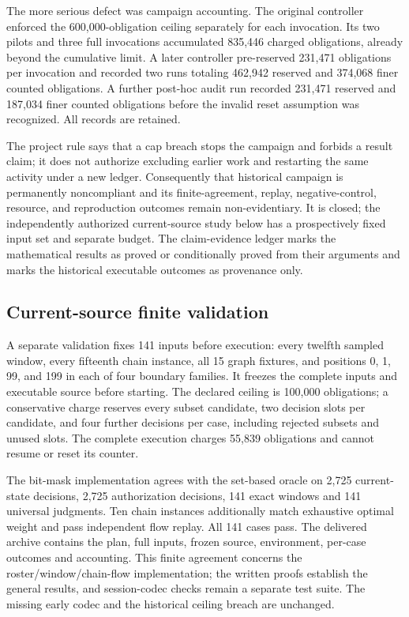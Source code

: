 \documentclass[11pt]{article}
\theoremstyle{definition}
\begin{document}
The more serious defect was campaign accounting.  The original controller enforced the 600,000-obligation ceiling separately for each invocation.  Its two pilots and three full invocations accumulated 835,446 charged obligations, already beyond the cumulative limit.  A later controller pre-reserved 231,471 obligations per invocation and recorded two runs totaling 462,942 reserved and 374,068 finer counted obligations.  A further post-hoc audit run recorded 231,471 reserved and 187,034 finer counted obligations before the invalid reset assumption was recognized.  All records are retained.

The project rule says that a cap breach stops the campaign and forbids a result claim; it does not authorize excluding earlier work and restarting the same activity under a new ledger.  Consequently that historical campaign is permanently noncompliant and its finite-agreement, replay, negative-control, resource, and reproduction outcomes remain non-evidentiary. It is closed; the independently authorized current-source study below has a prospectively fixed input set and separate budget.  The claim-evidence ledger marks the mathematical results as proved or conditionally proved from their arguments and marks the historical executable outcomes as provenance only.

\subsection{Current-source finite validation}
A separate validation fixes 141 inputs before execution: every twelfth sampled window, every fifteenth chain instance, all 15 graph fixtures, and positions 0, 1, 99, and 199 in each of four boundary families. It freezes the complete inputs and executable source before starting. The declared ceiling is 100,000 obligations; a conservative charge reserves every subset candidate, two decision slots per candidate, and four further decisions per case, including rejected subsets and unused slots. The complete execution charges 55,839 obligations and cannot resume or reset its counter.

The bit-mask implementation agrees with the set-based oracle on 2,725 current-state decisions, 2,725 authorization decisions, 141 exact windows and 141 universal judgments. Ten chain instances additionally match exhaustive optimal weight and pass independent flow replay. All 141 cases pass. The delivered archive contains the plan, full inputs, frozen source, environment, per-case outcomes and accounting. This finite agreement concerns the roster/window/chain-flow implementation; the written proofs establish the general results, and session-codec checks remain a separate test suite. The missing early codec and the historical ceiling breach are unchanged.
\end{document}
